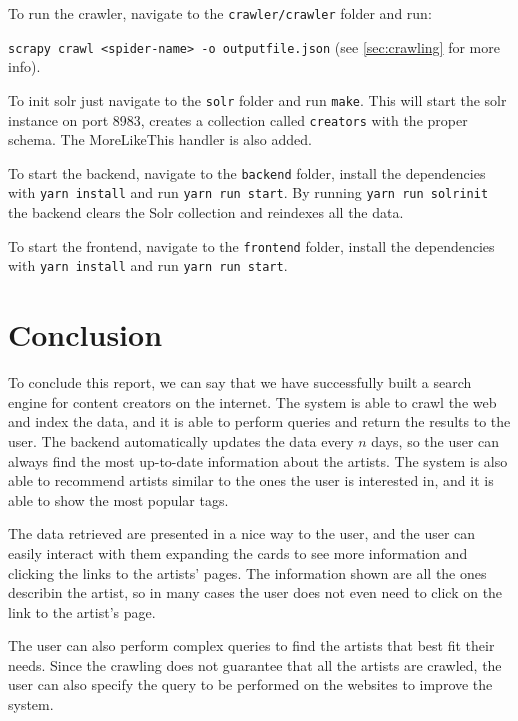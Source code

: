 \documentclass[tikz,14pt]{article}
\begin{document}
To run the crawler, navigate to the \texttt{crawler/crawler} folder and run:

\texttt{scrapy crawl <spider-name> -o outputfile.json} (see \autoref{sec:crawling} for more info).

To init solr just navigate to the \texttt{solr} folder and run \texttt{make}.
This will start the solr instance on port 8983, creates a collection called \verb|creators| with the proper schema.
The MoreLikeThis handler is also added.

To start the backend, navigate to the \texttt{backend} folder, install the dependencies with \texttt{yarn install} and run \texttt{yarn run start}.
By running \texttt{yarn run solrinit} the backend clears the Solr collection and reindexes all the data.

To start the frontend, navigate to the \texttt{frontend} folder, install the dependencies with \texttt{yarn install} and run \texttt{yarn run start}.



\section{Conclusion}

To conclude this report, we can say that we have successfully built a search engine for content creators on the internet.
The system is able to crawl the web and index the data, and it is able to perform queries and return the results to the user.
The backend automatically updates the data every $n$ days, so the user can always find the most up-to-date information about the artists.
The system is also able to recommend artists similar to the ones the user is interested in, and it is able to show the most popular tags.

The data retrieved are presented in a nice way to the user, and the user can easily interact with them expanding the cards
to see more information and clicking the links to the artists' pages.
The information shown are all the ones describin the artist, so in many cases the user does not even need to click on the link to the artist's page.

The user can also perform complex queries to find the artists that best fit their needs.
Since the crawling does not guarantee that all the artists are crawled, the user can also specify the query to be performed on the websites to improve the system.





\clearpage
\end{document}
